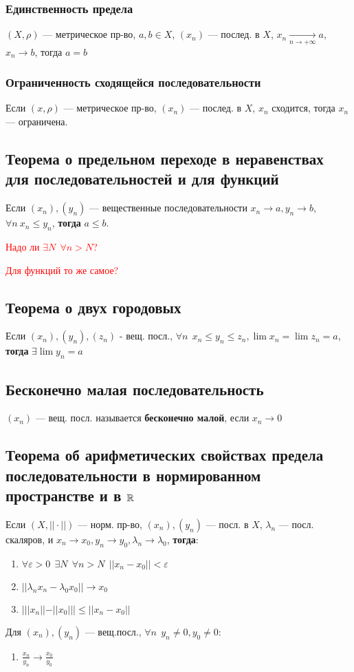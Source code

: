 \subsubsection{Единственность предела}

$(X,\rho)$ --- метрическое пр-во, $a,b\in X$, $(x_n)$ --- послед. в $X$,
$x_n\xrightarrow[n\to +\infty]{} a$, $x_n\to b$,
тогда $a=b$

\subsubsection{Ограниченность сходящейся последовательности}

Если $(x,\rho)$ --- метрическое пр-во, $(x_n)$ --- послед. в $X$, $x_n$ сходится, тогда $x_n$ --- ограничена.

\subsection{Теорема о предельном переходе в неравенствах для последовательностей и для функций}

Если $(x_n),(y_n)$ --- вещественные последовательности $x_n\to a, y_n\to b$, $\forall n \ x_n\leq y_n$, \textbf{тогда} $a\leq b$.

\textcolor{red}{Надо ли $\exists N \ \ \forall n > N$?}

\textcolor{red}{Для функций то же самое?}

\subsection{Теорема о двух городовых}

Если $(x_n),(y_n),(z_n)$ - вещ. посл., $\forall n \ \ x_n\leq y_n\leq z_n, \lim x_n=\lim z_n =a$, \textbf{тогда} $\exists \lim y_n=a$

\subsection{Бесконечно малая последовательность}

$(x_n)$ --- вещ. посл. называется \textbf{бесконечно малой}, если $x_n\to 0$

\subsection{Теорема об арифметических свойствах предела последовательности в нормированном пространстве и в $\operatorname*{\mathbb{R}}$}

Если $(X, ||\cdot||)$ --- норм. пр-во, $(x_n),(y_n)$ --- посл. в $X$, $\lambda_n$ ---
посл. скаляров, и $x_n\to x_0, y_n\to y_0, \lambda_n\to \lambda_0$, \textbf{тогда}:
\begin{enumerate}
\item $\forall \varepsilon>0 \ \ \exists N \ \ \forall n>N \ \ ||x_n-x_0||<\varepsilon$
\item $||\lambda_nx_n-\lambda_0x_0||\to x_0$
\item $|||x_n||-||x_0|||\leq||x_n-x_0||$
\end{enumerate}

Для $(x_n),(y_n)$ 
--- вещ.посл., $\forall n \ \ y_n\not =0, y_0\not = 0$:
\begin{enumerate}[resume]
\item $\frac{x_n}{y_n}\to\frac{x_0}{y_0}$
\end{enumerate}

